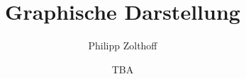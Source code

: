 

\author{Philipp Zolthoff}
\title{Graphische Darstellung}
\date{TBA}



\maketitle

\tableofcontents
\newpage




